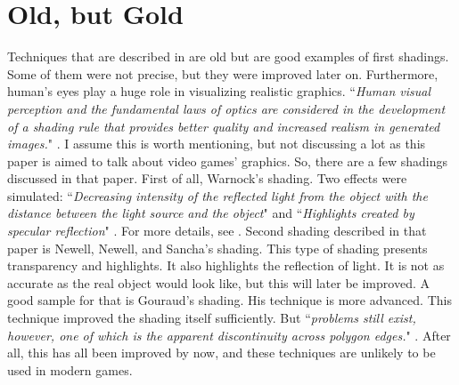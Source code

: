 \documentclass{scrartcl}
\begin{document}
\section{Old, but Gold}
Techniques that are described in \cite{phong1975illumination} are old but are good examples of first shadings.
Some of them were not precise, but they were improved later on.
Furthermore, human's eyes play a huge role in visualizing realistic graphics.
``\textit{Human visual perception and the fundamental laws of optics are considered in the development of a shading rule that provides better quality and increased realism in generated images.}"  \cite[p.~311]{phong1975illumination}.
I assume this is worth mentioning, but not discussing a lot as this paper is aimed to talk about video games' graphics.
So, there are a few shadings discussed in that paper.
First of all, Warnock's shading.
Two effects were simulated: ``\textit{Decreasing intensity of the reflected light from the object with the distance between the light source and the object}" \cite[p.~313]{phong1975illumination}
and ``\textit{Highlights created by specular reflection}" \cite[p.~313]{phong1975illumination}. 
For more details, see \cite{phong1975illumination}.
Second shading described in that paper is Newell, Newell, and Sancha's shading.
This type of shading presents transparency and highlights.
It also highlights the reflection of light.
It is not as accurate as the real object would look like, but this will later be improved.
A good sample for that is Gouraud's shading.
His technique is more advanced.
This technique improved the shading itself sufficiently.
But ``\textit{problems still exist, however, one of which is the apparent discontinuity across polygon edges.}" \cite[p.~314]{phong1975illumination}.
After all, this has all been improved by now, and these techniques are unlikely to be used in modern games.
\end{document}
